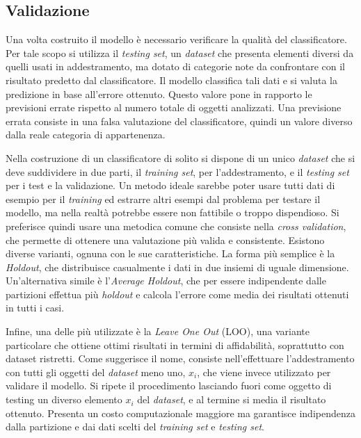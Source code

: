\subsection{Validazione}
Una volta costruito il modello è necessario verificare la qualità del classificatore. Per tale
scopo si utilizza il \textit{testing set}, un \textit{dataset} che presenta elementi diversi da quelli usati in
addestramento, ma dotato di categorie note da confrontare con il risultato predetto dal
classificatore. Il modello classifica tali dati e si valuta la predizione in base all’errore
ottenuto. Questo valore pone in rapporto le previsioni errate rispetto al numero totale di
oggetti analizzati. Una previsione errata consiste in una falsa valutazione del classificatore,
quindi un valore diverso dalla reale categoria di appartenenza.

Nella costruzione di un classificatore di solito si dispone di un unico \textit{dataset} che si deve
suddividere in due parti, il \textit{training set}, per l’addestramento, e il \textit{testing set} per i test e la
validazione. Un metodo ideale sarebbe poter usare tutti dati di esempio per il \textit{training} ed
estrarre altri esempi dal problema per testare il modello, ma nella realtà potrebbe essere non
fattibile o troppo dispendioso. Si preferisce quindi usare una metodica comune che consiste
nella \textit{cross validation}, che permette di ottenere una valutazione più valida e consistente.
Esistono diverse varianti, ognuna con le sue caratteristiche. La forma più semplice è la
\textit{Holdout}, che distribuisce casualmente i dati in due insiemi di uguale dimensione.
Un'alternativa simile è l’\textit{Average Holdout}, che per essere indipendente dalle partizioni effettua
più \textit{holdout} e calcola l’errore come media dei risultati ottenuti in tutti i casi.

Infine, una delle più utilizzate è la \textit{Leave One Out} (LOO), una variante particolare che ottiene
ottimi risultati in termini di affidabilità, soprattutto con dataset ristretti. Come suggerisce il
nome, consiste nell’effettuare l’addestramento con tutti gli oggetti del \textit{dataset} meno uno, 
\( x_{i} \), che viene invece utilizzato per validare il modello. Si ripete il procedimento lasciando fuori
come oggetto di testing un diverso elemento \( x_{i} \) del \textit{dataset}, e al termine si media il risultato
ottenuto. Presenta un costo computazionale maggiore ma garantisce indipendenza dalla
partizione e dai dati scelti del \textit{training set} e \textit{testing set}.

